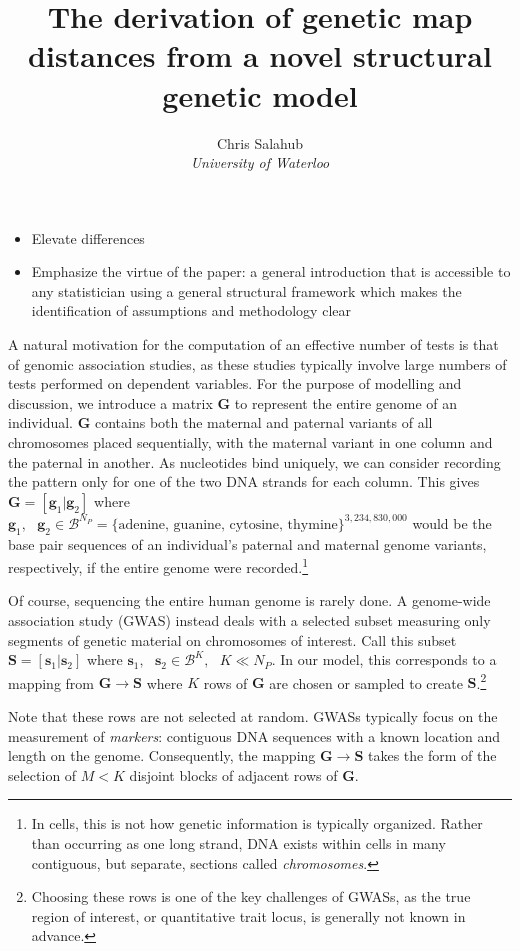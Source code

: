 \documentclass{article}
\title{The derivation of genetic map distances from a novel structural genetic model}
\author{Chris Salahub \\
	\textit{University of Waterloo}}
\newcommand{\ve}[1]{\mathbf{#1}}           %
\newcommand{\m}[1]{\mathbf{#1}}               %
\begin{document}
	
\maketitle



\begin{itemize}
	\item Elevate differences
	\item Emphasize the virtue of the paper: a general introduction that is accessible to any statistician using a general structural framework which makes the identification of assumptions and methodology clear
\end{itemize}

A natural motivation for the computation of an effective number of tests is that of genomic association studies, as these studies typically involve large numbers of tests performed on dependent variables. For the purpose of modelling and discussion, we introduce a matrix $\m{G}$ to represent the entire genome of an individual. $\m{G}$ contains both the maternal and paternal variants of all chromosomes placed sequentially, with the maternal variant in one column and the paternal in another. As nucleotides bind uniquely, we can consider recording the pattern only for one of the two DNA strands for each column. This gives $\m{G} = [\ve{g}_1| \ve{g}_2]$ where $\ve{g}_1,\text{ } \ve{g}_2 \in \mathcal{B}^{N_P} = \{\text{adenine, guanine, cytosine, thymine}\}^{3,234,830,000}$ would be the base pair sequences of an individual's paternal and maternal genome variants, respectively, if the entire genome were recorded.\footnote{In cells, this is not how genetic information is typically organized. Rather than occurring as one long strand, DNA exists within cells in many contiguous, but separate, sections called \textit{chromosomes}.}

Of course, sequencing the entire human genome is rarely done. A genome-wide association study (GWAS) instead deals with a selected subset measuring only segments of genetic material on chromosomes of interest. Call this subset $\m{S} = [\ve{s}_1 | \ve{s}_2]$ where $\ve{s}_1, \text{ } \ve{s}_2 \in \mathcal{B}^K, \text{ } K \ll N_P$. In our model, this corresponds to a mapping from $\m{G} \rightarrow \m{S}$ where $K$ rows of $\m{G}$ are chosen or sampled to create $\m{S}$.\footnote{Choosing these rows is one of the key challenges of GWASs, as the true region of interest, or quantitative trait locus, is generally not known in advance.}

Note that these rows are not selected at random. GWASs typically focus on the measurement of \textit{markers}: contiguous DNA sequences with a known location and length on the genome. Consequently, the mapping $\m{G} \rightarrow \m{S}$ takes the form of the selection of $M < K$ disjoint blocks of adjacent rows of $\m{G}$. 
\end{document}

